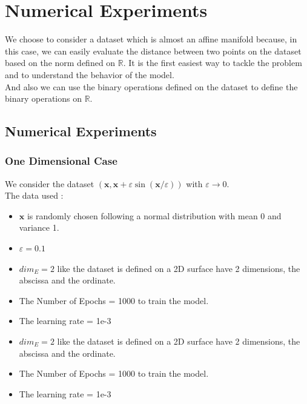 \documentclass{report}
\begin{document}
\section{Numerical Experiments}
    We choose to consider a dataset  which is almost an affine manifold because, in this case, we can easily evaluate the distance between two points on the dataset based on the norm defined on $\mathbb{R}$. It is the first easiest way to tackle the problem and to understand the behavior of the model.\\
    And also we can use the binary operations defined on the dataset to define the binary operations on $\mathbb{R}$.

    \subsection{Numerical Experiments}
        \subsubsection{One Dimensional Case}
            We consider the dataset $(\mathbf{x}, \mathbf{x}+\varepsilon \sin (\mathbf{x} / \varepsilon))$ with $\varepsilon \rightarrow 0$.
            \\
            The data used :
            \begin{itemize}
                \item $\mathbf{x}$ is randomly chosen following a normal distribution with mean 0 and variance 1.
                \item $\varepsilon = 0.1$
                \item  $dim_E = 2$ like the dataset is defined on a 2D 
                        surface have 2 dimensions, the abscissa and the ordinate.
                \item The Number of Epochs = 1000  to train the model.
                \item The learning rate = 1e-3
                \item  $dim_E = 2$ like the dataset is defined on a 2D 
                        surface have 2 dimensions, the abscissa and the ordinate.
                \item The Number of Epochs = 1000  to train the model.
                \item The learning rate = 1e-3
            \end{itemize}
\end{document}
